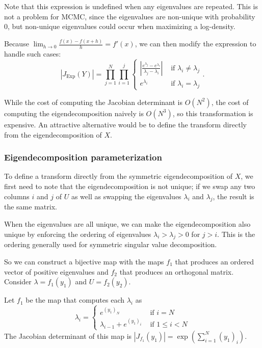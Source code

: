 \documentclass[11pt]{article}
\newcommand{\abs}[1]{\left| #1 \right|}
\newcommand{\absdet}[1]{\abs{#1}}
\newcommand{\Exp}{\mathrm{Exp}}
\begin{document}
Note that this expression is undefined when any eigenvalues are repeated.
This is not a problem for MCMC, since the eigenvalues are non-unique with probability 0, but non-unique eigenvalues could occur when maximizing a log-density.

Because $\lim_{h \to 0} \frac{f(x) - f(x + h)}{h} = f'(x)$, we can then modify the expression to handle such cases:
\[
  \absdet{J_{\Exp}(Y)} = \prod_{j=1}^N \prod_{i=1}^j \begin{cases}
    \left|\frac{e^{\lambda_j} - e^{\lambda_i}}{\lambda_j - \lambda_i}\right| &\text{ if } \lambda_i \ne \lambda_j \\ 
    e^{\lambda_i} &\text{ if } \lambda_i = \lambda_j
  \end{cases}.
\]

While the cost of computing the Jacobian determinant is $O(N^2)$, the cost of computing the eigendecomposition naively is $O(N^3)$, so this transformation is expensive.
An attractive alternative would be to define the transform directly from the eigendecomposition of $X$.

\subsubsection{Eigendecomposition parameterization}

To define a transform directly from the symmetric eigendecomposition of $X$, we first need to note that the eigendecomposition is not unique; if we swap any two columns $i$ and $j$ of $U$ as well as swapping the eigenvalues $\lambda_i$ and $\lambda_j$, the result is the same matrix.

When the eigenvalues are all unique, we can make the eigendecomposition also unique by enforcing the ordering of eigenvalues $\lambda_i > \lambda_j > 0$ for $j > i$.
This is the ordering generally used for symmetric singular value decomposition.

So we can construct a bijective map with the maps $f_1$ that produces an ordered vector of positive eigenvalues and $f_2$ that produces an orthogonal matrix.
Consider $\lambda = f_1(y_1)$ and $U = f_2(y_2)$.

Let $f_1$ be the map that computes each $\lambda_i$ as
\[
  \lambda_i = \begin{cases}
    e^{(y_1)_N} &\text{ if } i = N\\
    \lambda_{i-1} + e^{(y_1)_i} &\text{ if } 1 \le i < N
  \end{cases}
\]
The Jacobian determinant of this map is $\absdet{J_{f_1}(y_1)} = \exp\left(\sum_{i=1}^N (y_1)_i\right)$.
\end{document}
